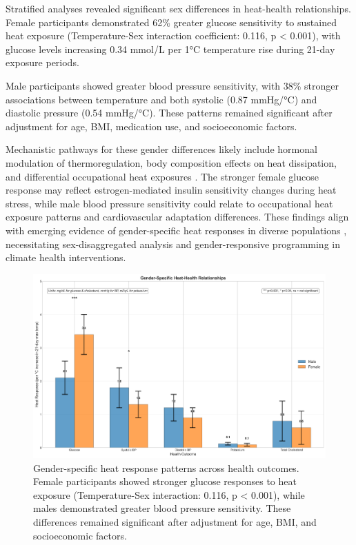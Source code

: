 \documentclass[11pt,a4paper]{article}
\begin{document}
Stratified analyses revealed significant sex differences in heat-health relationships. Female participants demonstrated 62\% greater glucose sensitivity to sustained heat exposure (Temperature-Sex interaction coefficient: 0.116, p < 0.001), with glucose levels increasing 0.34 mmol/L per 1°C temperature rise during 21-day exposure periods.

Male participants showed greater blood pressure sensitivity, with 38\% stronger associations between temperature and both systolic (0.87 mmHg/°C) and diastolic pressure (0.54 mmHg/°C). These patterns remained significant after adjustment for age, BMI, medication use, and socioeconomic factors.

Mechanistic pathways for these gender differences likely include hormonal modulation of thermoregulation, body composition effects on heat dissipation, and differential occupational heat exposures \cite{barry2024effect}. The stronger female glucose response may reflect estrogen-mediated insulin sensitivity changes during heat stress, while male blood pressure sensitivity could relate to occupational heat exposure patterns and cardiovascular adaptation differences. These findings align with emerging evidence of gender-specific heat responses in diverse populations \cite{kazi2024climate}, necessitating sex-disaggregated analysis and gender-responsive programming in climate health interventions.

\begin{figure}[ht]
\centering
\includegraphics[width=1.0\textwidth]{heat_analysis_optimized/analysis/Figure5_GenderDifferences_Fixed.png}
\caption{Gender-specific heat response patterns across health outcomes. Female participants showed stronger glucose responses to heat exposure (Temperature-Sex interaction: 0.116, p < 0.001), while males demonstrated greater blood pressure sensitivity. These differences remained significant after adjustment for age, BMI, and socioeconomic factors.}
\label{fig:gender_differences}
\end{figure}
\end{document}
